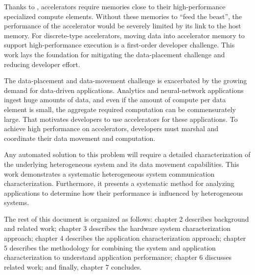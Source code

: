 Thanks to , accelerators require memories close to their high-performance specialized compute elements.
Without these memories to ``feed the beast'', the performance of the accelerator would be severely limited by its link to the host memory.
For discrete-type accelerators, moving data into accelerator memory to support high-performance execution is a first-order developer challenge.
This work lays the foundation for mitigating the data-placement challenge and reducing developer effort.


The data-placement and data-movement challenge is exacerbated by the growing demand for data-driven applications.
Analytics and neural-network applications ingest huge amounts of data, and even if the amount of compute per data element is small, the aggregate required computation can be commensurately large.
That motivates developers to use accelerators for these applications.
To achieve high performance on accelerators, developers must marshal and coordinate their data movement and computation.

Any automated solution to this problem will require a detailed characterization of the underlying heterogeneous system and its data movement capabilities.
This work demonstrates a systematic heterogeneous system communication characterization.
Furthermore, it presents a systematic method for analyzing applications to determine how their performance is influenced by heterogeneous systems.

The rest of this document is organized as follows:
chapter 2 describes background and related work;
chapter 3 describes the hardware system characterization approach;
chapter 4 describes the application characterization approach;
chapter 5 describes the methodology for combining the system and application characterization to understand application performance;
chapter 6 discusses related work;
and finally, chapter 7 concludes.
